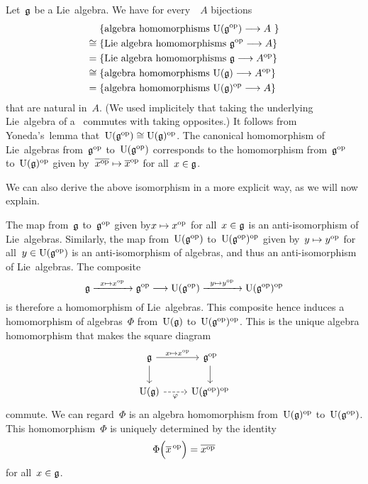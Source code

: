 \begin{example}
  \label{uea of opposite by first principles}
  Let~$\mathfrak{g}$ be a Lie~algebra.
  We have for every~{\algebra{$\kf$}}~$A$ bijections
  \begin{align*}
    {}&
    \{ \text{algebra homomorphisms~$\Univ(\glie^\op) \to A$   } \}
    \\
    \cong{}&
    \{ \text{Lie~algebra homomorphisms~$\glie^\op \to A$} \}
    \\
    ={}&
    \{ \text{Lie~algebra homomorphisms~$\glie \to A^\op$} \}
    \\
    \cong{}&
    \{ \text{algebra homomorphisms~$\Univ(\glie) \to A^\op$} \}
    \\
    ={}&
    \{ \text{algebra homomorphisms~$\Univ(\glie)^\op \to A$} \}
  \end{align*}
  that are natural in~$A$.
  (We used implicitely that taking the underlying Lie~algebra of a~{\algebra{$\kf$}} commutes with taking opposites.)
  It follows from Yoneda’s~lemma that~$\operatorname{U}(\mathfrak{g}^{\mathrm{op}}) \cong \operatorname{U}(\mathfrak{g})^{\mathrm{op}}$.
  The canonical homomorphism of Lie~algebras from~$\mathfrak{g}^{\mathrm{op}}$ to~$\operatorname{U}(\mathfrak{g}^{\mathrm{op}})$ corresponds to the homomorphism from~$\mathfrak{g}^{\mathrm{op}}$ to~$\operatorname{U}(\mathfrak{g})^{\mathrm{op}}$ given by~$\class{x^{\op}} \mapsto \class{x}^{\op}$ for all~$x \in \mathfrak{g}$.

  We can also derive the above isomorphism in a more explicit way, as we will now explain.

  The map from~$\mathfrak{g}$ to~$\mathfrak{g}^{\mathrm{op}}$ given by$x \mapsto x^{\op}$ for all~$x \in \mathfrak{g}$ is an anti-isomorphism of Lie~algebras.
  Similarly, the map from~$\operatorname{U}(\mathfrak{g}^{\mathrm{op}})$ to~$\operatorname{U}(\mathfrak{g}^{\mathrm{op}})^{\mathrm{op}}$ given by~$y \mapsto y^{\op}$ for all~$y \in \operatorname{U}(\mathfrak{g}^{\mathrm{op}})$ is an anti-isomorphism of algebras, and thus an anti-isomorphism of Lie~algebras. 
  The composite
  \[
    \glie
    \xto{x \mapsto x^{\op}}
    \glie^{\op}
    \to
    \Univ(\glie^{\op})
    \xto{y \mapsto y^{\op}}
    \Univ(\glie^{\op})^{\op}
  \]
  is therefore a homomorphism of Lie~algebras.
  This composite hence induces a homomorphism of algebras~$\Phi$ from~$\operatorname{U}(\mathfrak{g})$ to~$\operatorname{U}(\mathfrak{g}^{\mathrm{op}})^{\mathrm{op}}$.
  This is the unique algebra homomorphism that makes the square diagram
  \[
    \begin{tikzcd}
      \glie
      \arrow{r}[above]{x \mapsto x^{\op}}
      \arrow{d}
      &
      \glie^{\op}
      \arrow{d}
      \\
      \Univ(\glie)
      \arrow[dashed]{r}[below]{\varphi}
      &
      \Univ(\glie^{\op})^{\op}
    \end{tikzcd}
  \]
  commute.
  We can regard~$\Phi$ is an algebra homomorphism from~$\operatorname{U}(\mathfrak{g})^{\mathrm{op}}$ to~$\operatorname{U}(\mathfrak{g}^{\mathrm{op}})$.
  This homomorphism~$\Phi$ is uniquely determined by the identity
  \[
    \Phi\Bigl( \overline{x}^{\,\mathrm{op}} \Bigr)
    =
    \overline{ x^{\mathrm{op}} } 
  \]
  for all~$x \in \mathfrak{g}$.


\end{example}

